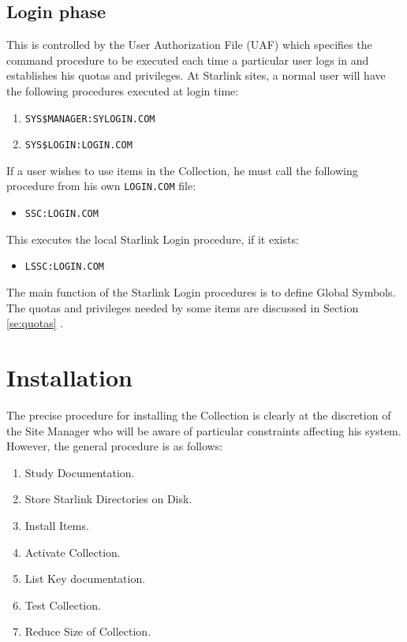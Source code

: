 \subsection {Login phase}
\label{ss:login}

This is controlled by the User Authorization File (UAF) which specifies the
command procedure to be executed each time a particular user logs in and
establishes his quotas and privileges. At Starlink sites, a normal user will
have the following procedures executed at login time:

\begin{enumerate}
\item {\tt SYS\$MANAGER:SYLOGIN.COM}
\item {\tt SYS\$LOGIN:LOGIN.COM}
\end{enumerate}

If a user wishes to use items in the Collection, he must call the following
procedure from his own {\tt LOGIN.COM} file:

\begin{itemize}
\item {\tt SSC:LOGIN.COM}
\end{itemize}

This executes the local Starlink Login procedure, if it exists:

\begin{itemize}
\item {\tt LSSC:LOGIN.COM}
\end{itemize}

The main function of the Starlink Login procedures is to define Global Symbols.
The quotas and privileges needed by some items are discussed in Section
\ref{se:quotas} .

\section {Installation}
\label{se:install}

The precise procedure for installing the Collection is clearly at the
discretion of the Site Manager who will be aware of particular constraints
affecting his system. However, the general procedure is as follows:

\begin{enumerate}
\item Study Documentation.
\item Store Starlink Directories on Disk.
\item Install Items.
\item Activate Collection.
\item List Key documentation.
\item Test Collection.
\item Reduce Size of Collection.
\end{enumerate}

